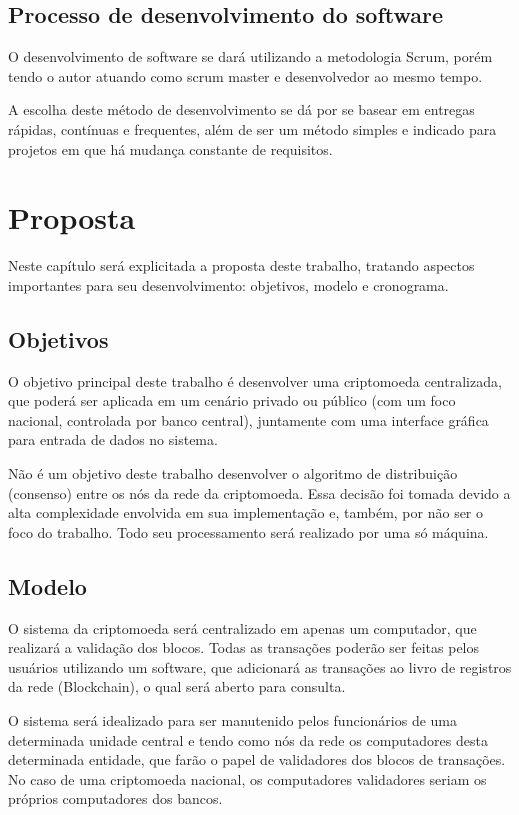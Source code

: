 \documentclass[openright]{normas-utf-tex} %
\begin{document}
\section{Processo de desenvolvimento do software}

O desenvolvimento de software se dará utilizando a metodologia Scrum, porém tendo o autor atuando como scrum master e desenvolvedor ao mesmo tempo. 

A escolha deste método de desenvolvimento se dá por se basear em entregas rápidas, contínuas e frequentes, além de ser um método simples e indicado para projetos em que há mudança constante de requisitos. 

\chapter{Proposta}

Neste capítulo será explicitada a proposta deste trabalho, tratando aspectos importantes para seu desenvolvimento: objetivos, modelo e cronograma.

\section{Objetivos}

O objetivo principal deste trabalho é desenvolver uma criptomoeda centralizada, que poderá ser aplicada em um cenário privado ou público (com um foco nacional, controlada por banco central), juntamente com uma interface gráfica para entrada de dados no sistema.

Não é um objetivo deste trabalho desenvolver o algoritmo de distribuição (consenso) entre os nós da rede da criptomoeda. Essa decisão foi tomada devido a alta complexidade envolvida em sua implementação e, também, por não ser o foco do trabalho. Todo seu processamento será realizado por uma só máquina.

\section{Modelo}

O sistema da criptomoeda será centralizado em apenas um computador, que realizará a validação dos blocos. Todas as transações poderão ser feitas pelos usuários utilizando um software, que adicionará as transações ao livro de registros da rede (Blockchain), o qual será aberto para consulta.

O sistema será idealizado para ser manutenido pelos funcionários de uma determinada unidade central e tendo como nós da rede os computadores desta determinada entidade, que farão o papel de validadores dos blocos de transações. No caso de uma criptomoeda nacional, os computadores validadores seriam os próprios computadores dos bancos.
\end{document}
